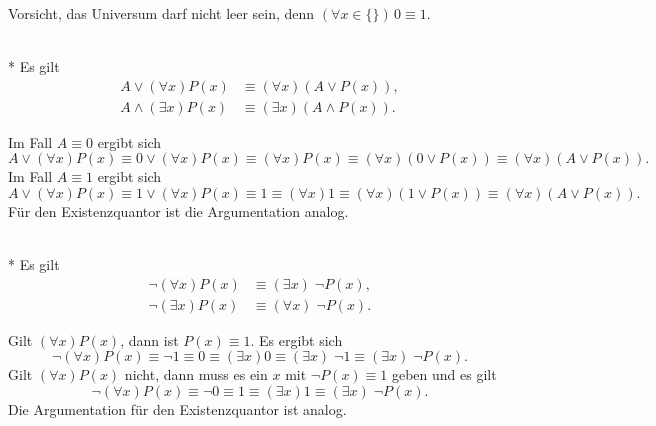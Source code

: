 Vorsicht, das Universum darf nicht leer sein,
denn $(\forall x{\in}\{\})\,0\equiv 1$.

\begin{Satz}\mbox{}\\*
Es gilt
\begin{align*}
A\lor (\forall x)P(x) &\equiv (\forall x)(A\lor P(x)),\\
A\land(\exists x)P(x) &\equiv (\exists x)(A\land P(x)).
\end{align*}
\end{Satz}
 Im Fall $A\equiv 0$ ergibt sich
\[A\lor(\forall x)P(x) \equiv 0\lor(\forall x)P(x)
\equiv (\forall x)P(x)\equiv (\forall x)(0\lor P(x))\equiv (\forall x)(A\lor P(x)).\]
Im Fall $A\equiv 1$ ergibt sich
\[A\lor(\forall x)P(x)\equiv 1\lor(\forall x)P(x) \equiv 1 \equiv (\forall x)1
\equiv (\forall x)(1\lor P(x))\equiv (\forall x)(A\lor P(x)).\]
Für den Existenzquantor ist die Argumentation analog.\;\qedsymbol

\begin{Satz}\mbox{}\\*
Es gilt
\begin{align*}
\neg (\forall x)P(x) &\equiv (\exists x)\;\neg P(x),\\
\neg (\exists x)P(x) &\equiv (\forall x)\;\neg P(x).
\end{align*}
\end{Satz}
 Gilt $(\forall x)P(x)$, dann ist $P(x)\equiv 1$.
Es ergibt sich
\begin{equation}
\neg(\forall x)P(x) \equiv \neg 1 \equiv 0 \equiv (\exists x)0
\equiv (\exists x)\;\neg 1\equiv (\exists x)\;\neg P(x).
\end{equation}
Gilt $(\forall x)P(x)$ nicht, dann muss es ein $x$ mit
$\neg P(x)\equiv 1$ geben und es gilt
\begin{equation}
\neg(\forall x)P(x) \equiv \neg 0\equiv 1\equiv (\exists x)1
\equiv (\exists x)\;\neg P(x).
\end{equation}
Die Argumentation für den Existenzquantor ist analog.\;\qedsymbol

